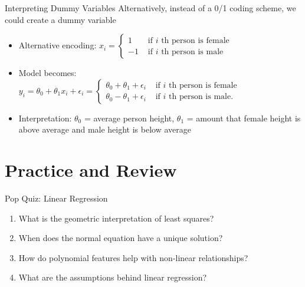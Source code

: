 \documentclass{beamer}
\begin{document}
    \begin{frame}{Interpreting Dummy Variables}
    Alternatively, instead of a 0/1 coding scheme, we could create a dummy variable
    
    \begin{itemize}[<+->]
        \item Alternative encoding: \(x_{i}=\left\{\begin{array}{ll}{1} & {\text { if } i \text { th person is female }} \\ {-1} & {\text { if } i \text { th person is male }}\end{array}\right.\)
        \item Model becomes: \(y_{i}=\theta_{0}+\theta_{1} x_{i}+\epsilon_{i}=\left\{\begin{array}{ll}{\theta_{0}+\theta_{1}+\epsilon_{i}} & {\text { if } i \text { th person is female }} \\ {\theta_{0}-\theta_{1}+\epsilon_{i}} & {\text { if } i \text { th person is male. }}\end{array}\right.\)
        \item Interpretation: $\theta_{0}$ = average person height, $\theta_{1}$ = amount that female height is above average and male height is below average
    \end{itemize}
\end{frame}

\section{Practice and Review}

\begin{frame}{Pop Quiz: Linear Regression}
\begin{enumerate}[<+->]
\item What is the geometric interpretation of least squares?
\item When does the normal equation have a unique solution?
\item How do polynomial features help with non-linear relationships?
\item What are the assumptions behind linear regression?
\end{enumerate}
\end{frame}
\end{document}
